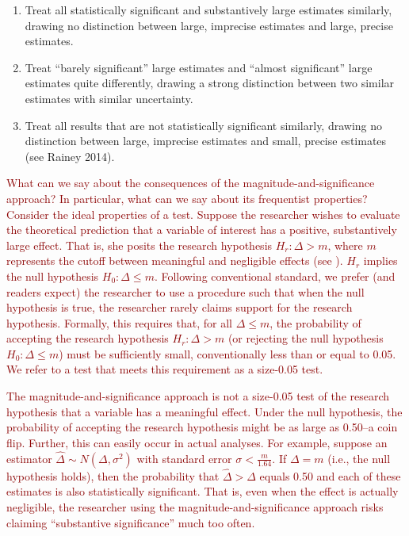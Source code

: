 \documentclass[12pt]{article}
\newcommand{\kelly}[1]{\textcolor{darkred}{#1}}
\begin{document}
\begin{enumerate}
\item Treat all statistically significant and substantively large estimates similarly, drawing no distinction between large, imprecise estimates and large, precise estimates.
\item Treat ``barely significant'' large estimates and ``almost significant'' large estimates quite differently, drawing a strong distinction between two similar estimates with similar uncertainty.
\item Treat all results that are not statistically significant similarly, drawing no distinction between large, imprecise estimates and small, precise estimates (see Rainey 2014).
\end{enumerate}

\kelly{What can we say about the consequences of the magnitude-and-significance approach? In particular, what can we say about its frequentist properties? Consider the ideal properties of a test. Suppose the researcher wishes to evaluate the theoretical prediction that a variable of interest has a positive, substantively large effect. That is, she posits the research hypothesis $H_r: \Delta > m$, where $m$ represents the cutoff between meaningful and negligible effects (see \citealt{Rainey2014a}). $H_r$ implies the null hypothesis $H_0: \Delta \leq m$. Following conventional standard, we prefer (and readers expect) the researcher to use a procedure such that when the null hypothesis is true, the researcher rarely claims support for the research hypothesis. Formally, this requires that, for all $\Delta \leq m$, the probability of accepting the research hypothesis $H_r: \Delta > m$ (or rejecting the null hypothesis $H_0: \Delta \leq m$) must be sufficiently small, conventionally less than or equal to 0.05. We refer to a test that meets this requirement as a size-0.05 test.}

\kelly{The magnitude-and-significance approach is not a size-0.05 test of the research hypothesis that a variable has a meaningful effect. Under the null hypothesis, the probability of accepting the research hypothesis might be as large as 0.50--a coin flip. Further, this can easily occur in actual analyses. For example, suppose an estimator $\hat{\Delta} \sim N(\Delta, \sigma^2)$ with standard error $\sigma < \frac{m}{1.64}$. If $\Delta = m$ (i.e., the null hypothesis holds), then the probability that $\hat{\Delta} > \Delta$ equals 0.50 and each of these estimates is also statistically significant. That is, even when the effect is actually negligible, the researcher using the magnitude-and-significance approach risks claiming ``substantive significance'' much too often.}
\end{document}
